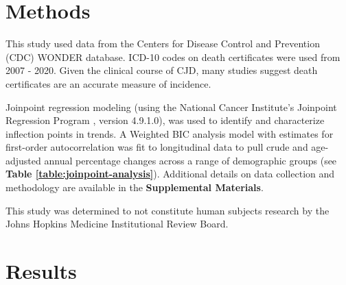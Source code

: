 \documentclass[12pt]{article}
\begin{document}
\section*{Methods}

\par \bigskip
\noindent This study used data from the Centers for Disease Control and Prevention (CDC) WONDER database\cite{CDCWonder}. ICD-10 codes on death certificates were used from 2007 - 2020. Given the clinical course of CJD, many studies suggest death certificates are an accurate measure of incidence\cite{NeuroEpi}.

\par \bigskip
\noindent Joinpoint regression modeling (using the National Cancer Institute’s Joinpoint Regression Program \cite{StatMed, Joinpoint}, version 4.9.1.0), was used to identify and characterize inflection points in trends. A Weighted BIC analysis model with estimates for first-order autocorrelation was fit to longitudinal data to pull crude and age-adjusted annual percentage changes across a range of demographic groups (see \textbf{Table \ref{table:joinpoint-analysis}}). Additional details on data collection and methodology are available in the \textbf{Supplemental Materials}.

\par \bigskip
\noindent This study was determined to not constitute human subjects research by the Johns Hopkins Medicine Institutional Review Board.

\newpage

\section*{Results}

\newpage
\end{document}
